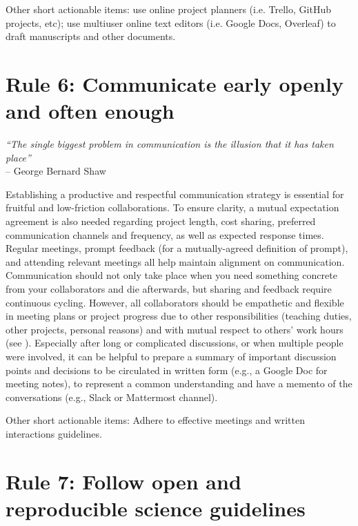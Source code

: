 \documentclass{article}
\begin{document}
Other short actionable items: use online project planners (i.e. Trello, GitHub projects, etc); use multiuser online text editors (i.e. Google Docs, Overleaf) to draft manuscripts and other documents.

\section*{Rule 6: Communicate early openly and often enough} %
\label{rule6_communication}

\begin{flushright}
\rightskip=1cm\textit{``The single biggest problem in communication is the illusion that it has taken place''} \\
\vspace{.2em}
\rightskip=0cm -- George Bernard Shaw
\end{flushright}

Establishing a productive and respectful communication strategy is essential for fruitful and low-friction collaborations. To ensure clarity, a mutual expectation agreement is also needed regarding project length, cost sharing, preferred communication channels and frequency, as well as expected response times. Regular meetings, prompt feedback (for a mutually-agreed definition of prompt), and attending relevant meetings all help maintain alignment on communication. Communication should not only take place when you need something concrete from your collaborators and die afterwards, but sharing and feedback require continuous cycling. However, all collaborators should be empathetic and flexible in meeting plans or project progress due to other responsibilities (teaching duties, other projects, personal reasons) and with mutual respect to others’ work hours (see ). Especially after long or complicated discussions, or when multiple people were involved, it can be helpful to prepare a summary of important discussion points and decisions to be circulated in written form (e.g., a Google Doc for meeting notes), to represent a common understanding and have a memento of the conversations (e.g., Slack or Mattermost channel).

Other short actionable items: Adhere to effective meetings\cite{leblanc2019planning} and written interactions guidelines\cite{gruber2020email}.

\section*{Rule 7: Follow open and reproducible science guidelines} %
\label{rule7_repro}
\end{document}
